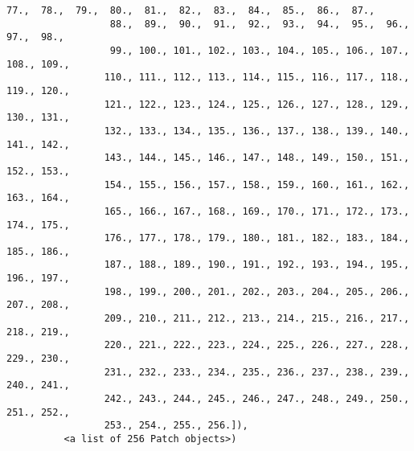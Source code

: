 \documentclass[11pt]{article}
\begin{document}
\begin{Verbatim}[commandchars=\\\{\}]
                  77.,  78.,  79.,  80.,  81.,  82.,  83.,  84.,  85.,  86.,  87.,
                  88.,  89.,  90.,  91.,  92.,  93.,  94.,  95.,  96.,  97.,  98.,
                  99., 100., 101., 102., 103., 104., 105., 106., 107., 108., 109.,
                 110., 111., 112., 113., 114., 115., 116., 117., 118., 119., 120.,
                 121., 122., 123., 124., 125., 126., 127., 128., 129., 130., 131.,
                 132., 133., 134., 135., 136., 137., 138., 139., 140., 141., 142.,
                 143., 144., 145., 146., 147., 148., 149., 150., 151., 152., 153.,
                 154., 155., 156., 157., 158., 159., 160., 161., 162., 163., 164.,
                 165., 166., 167., 168., 169., 170., 171., 172., 173., 174., 175.,
                 176., 177., 178., 179., 180., 181., 182., 183., 184., 185., 186.,
                 187., 188., 189., 190., 191., 192., 193., 194., 195., 196., 197.,
                 198., 199., 200., 201., 202., 203., 204., 205., 206., 207., 208.,
                 209., 210., 211., 212., 213., 214., 215., 216., 217., 218., 219.,
                 220., 221., 222., 223., 224., 225., 226., 227., 228., 229., 230.,
                 231., 232., 233., 234., 235., 236., 237., 238., 239., 240., 241.,
                 242., 243., 244., 245., 246., 247., 248., 249., 250., 251., 252.,
                 253., 254., 255., 256.]),
          <a list of 256 Patch objects>)
\end{Verbatim}
            
    \begin{center}
    \end{center}
    { \hspace*{\fill} \\}
    

    
    
    
    
\end{document}
